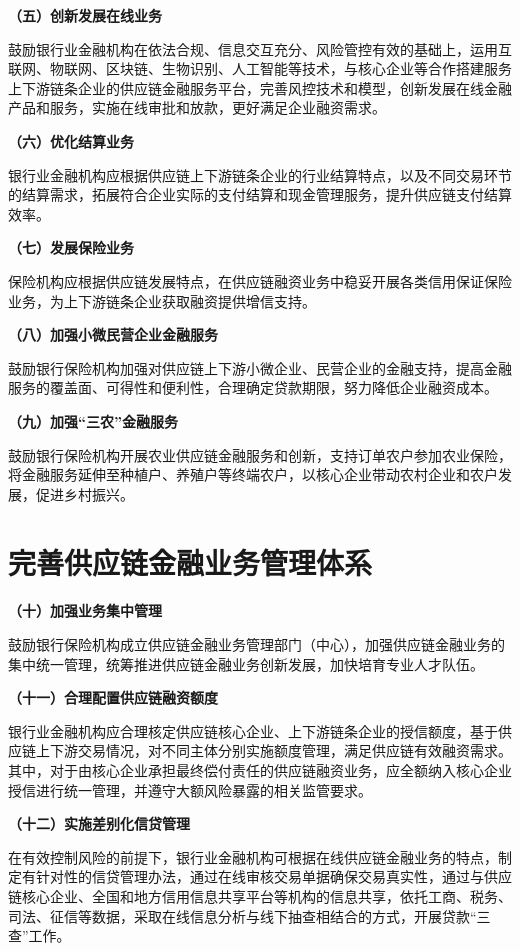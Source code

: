 { \bf （五）创新发展在线业务}

鼓励银行业金融机构在依法合规、信息交互充分、风险管控有效的基础上，运用互联网、物联网、区块链、生物识别、人工智能等技术，与核心企业等合作搭建服务上下游链条企业的供应链金融服务平台，完善风控技术和模型，创新发展在线金融产品和服务，实施在线审批和放款，更好满足企业融资需求。

{ \bf （六）优化结算业务}

银行业金融机构应根据供应链上下游链条企业的行业结算特点，以及不同交易环节的结算需求，拓展符合企业实际的支付结算和现金管理服务，提升供应链支付结算效率。

{ \bf （七）发展保险业务}

保险机构应根据供应链发展特点，在供应链融资业务中稳妥开展各类信用保证保险业务，为上下游链条企业获取融资提供增信支持。

{ \bf （八）加强小微民营企业金融服务}

鼓励银行保险机构加强对供应链上下游小微企业、民营企业的金融支持，提高金融服务的覆盖面、可得性和便利性，合理确定贷款期限，努力降低企业融资成本。

{ \bf （九）加强“三农”金融服务}

鼓励银行保险机构开展农业供应链金融服务和创新，支持订单农户参加农业保险，将金融服务延伸至种植户、养殖户等终端农户，以核心企业带动农村企业和农户发展，促进乡村振兴。

\section{完善供应链金融业务管理体系}

{ \bf （十）加强业务集中管理}

鼓励银行保险机构成立供应链金融业务管理部门（中心），加强供应链金融业务的集中统一管理，统筹推进供应链金融业务创新发展，加快培育专业人才队伍。

{ \bf （十一）合理配置供应链融资额度}

银行业金融机构应合理核定供应链核心企业、上下游链条企业的授信额度，基于供应链上下游交易情况，对不同主体分别实施额度管理，满足供应链有效融资需求。其中，对于由核心企业承担最终偿付责任的供应链融资业务，应全额纳入核心企业授信进行统一管理，并遵守大额风险暴露的相关监管要求。

{ \bf （十二）实施差别化信贷管理}

在有效控制风险的前提下，银行业金融机构可根据在线供应链金融业务的特点，制定有针对性的信贷管理办法，通过在线审核交易单据确保交易真实性，通过与供应链核心企业、全国和地方信用信息共享平台等机构的信息共享，依托工商、税务、司法、征信等数据，采取在线信息分析与线下抽查相结合的方式，开展贷款“三查”工作。

